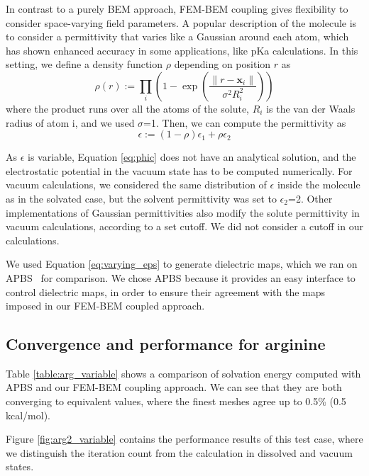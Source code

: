 In contrast to a purely BEM approach, FEM-BEM coupling gives flexibility to consider space-varying field parameters. 
A popular description of the molecule is to consider a permittivity that varies like a Gaussian around each atom,\cite{grant2001smooth} which has shown enhanced accuracy in some applications, like pKa calculations.\cite{li2013dielectric}
In this setting, we define a density function $\rho$ depending on position $r$ as
%
\begin{equation}
\rho(r) := \prod_i \left(1 - \exp{\left(\frac{\|r-\mathbf{x}_i\|}{\sigma^2 R_i^2}\right)}\right)
\end{equation}
%
where the product runs over all the atoms of the solute, $R_i$ is the van der Waals radius of atom i, and we used $\sigma$=1. Then, we can compute the permittivity as
%
\begin{equation}\label{eq:varying_eps}
\epsilon := \left(1-\rho \right) \epsilon_1 + \rho\epsilon_2
\end{equation}

As $\epsilon$ is variable, Equation \eqref{eq:phic} does not have an analytical solution, and the electrostatic potential in the vacuum state has to be computed numerically.
For vacuum calculations, we considered the same distribution of $\epsilon$ inside the molecule as in the solvated case, but the solvent permittivity was set to $\epsilon_2$=2. 
Other implementations of Gaussian permittivities also modify the solute permittivity in vacuum calculations, according to a set cutoff.\cite{li2013dielectric} We did not consider a cutoff in our calculations.


We used Equation \eqref{eq:varying_eps} to generate dielectric maps, which we ran on APBS~\cite{BakerETal2001} for comparison. 
We chose APBS because it provides an easy interface to control dielectric maps, in order to ensure their agreement with the maps imposed in our FEM-BEM coupled approach.

\subsection*{\sffamily \large Convergence and performance for arginine}

Table \ref{table:arg_variable} shows a comparison of solvation energy computed with APBS and our FEM-BEM coupling approach. We can see that they are both converging to equivalent values, where the finest meshes agree up to 0.5\% (0.5 kcal/mol).

Figure \ref{fig:arg2_variable} contains the performance results of this test case, where we distinguish the iteration count from the calculation in dissolved and vacuum states. 

